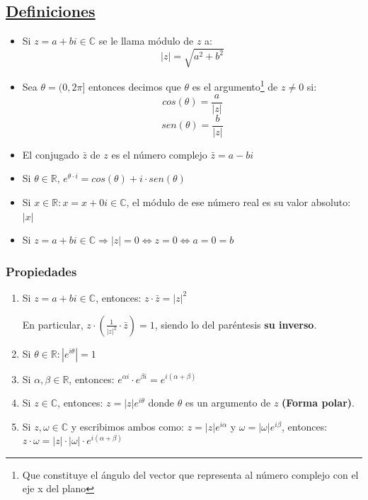 \documentclass[10pt,a4paper,openright]{book}
\begin{document}
\subsection*{\underline{Definiciones}}
\begin{itemize}
\item Si $z=a+bi\in \mathbb C$ se le llama módulo de $z$ a:
$$|z|=\sqrt{a^2+b^2}$$

\item Sea $\theta=(0,2\pi]$ entonces decimos que $\theta$ es el argumento\footnote{Que constituye el ángulo del vector que representa al número complejo con el eje x del plano} de $z\neq 0$ si:
$$cos(\theta)=\frac{a}{|z|}$$
$$sen(\theta)=\frac{b}{|z|}$$

\item El conjugado $\bar{z}$ de $z$ es el número complejo $\bar{z}=a-bi$

\item Si $\theta \in \mathbb R$, $e^{\theta\cdot i}=cos(\theta)+i\cdot sen(\theta)$

\item Si $x\in \mathbb R : x= x+0i\in \mathbb C$, el módulo de ese número real es su valor absoluto: $|x|$

\item Si $z=a+bi\in \mathbb C\Rightarrow |z|=0\Leftrightarrow z=0\Leftrightarrow a=0=b$
\end{itemize}

\subsubsection*{Propiedades}
\begin{enumerate}
\item Si $z=a+bi\in \mathbb C$, entonces: $z\cdot \bar{z}=|z|^2$\par
En particular, $z\cdot (\frac{1}{|z|^2}\cdot \bar{z})=1$, siendo lo del paréntesis \textbf{su inverso}.

\item Si $\theta\in \mathbb R: |e^{i\theta}|=1$

\item Si $\alpha, \beta \in \mathbb R$, entonces: $e^{\alpha i}\cdot e^{\beta i}=e^{i(\alpha +\beta)}$

\item Si $z\in \mathbb C$, entonces: $z=|z|e^{i\theta}$ donde $\theta$ es un argumento de $z$ \textbf{(Forma polar)}.

\item Si $z, \omega \in \mathbb C$ y escribimos ambos como: $z=|z|e^{i\alpha}$ y $\omega=|\omega|e^{i\beta}$, entonces: $z\cdot \omega=|z|\cdot |\omega|\cdot e^{i(\alpha +\beta)}$\par
\end{enumerate}
\end{document}
